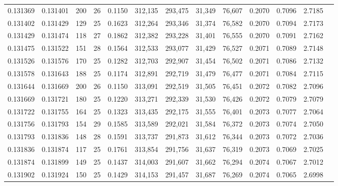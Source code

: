 \begin{tabular}{rrrrrrrrrrrrr}
0.131369 & 0.131401 & 200 &  26 &                                     0.1150 & 312,135 & 293,475 &  31,349 &  76,607 & 0.2070 & 0.7096 & 2.7185 \\
0.131402 & 0.131429 & 129 &  25 &                                     0.1623 & 312,264 & 293,346 &  31,374 &  76,582 & 0.2070 & 0.7094 & 2.7173 \\
0.131429 & 0.131474 & 118 &  27 &                                     0.1862 & 312,382 & 293,228 &  31,401 &  76,555 & 0.2070 & 0.7091 & 2.7162 \\
0.131475 & 0.131522 & 151 &  28 &                                     0.1564 & 312,533 & 293,077 &  31,429 &  76,527 & 0.2071 & 0.7089 & 2.7148 \\
0.131526 & 0.131576 & 170 &  25 &                                     0.1282 & 312,703 & 292,907 &  31,454 &  76,502 & 0.2071 & 0.7086 & 2.7132 \\
0.131578 & 0.131643 & 188 &  25 &                                     0.1174 & 312,891 & 292,719 &  31,479 &  76,477 & 0.2071 & 0.7084 & 2.7115 \\
0.131644 & 0.131669 & 200 &  26 &                                     0.1150 & 313,091 & 292,519 &  31,505 &  76,451 & 0.2072 & 0.7082 & 2.7096 \\
0.131669 & 0.131721 & 180 &  25 &                                     0.1220 & 313,271 & 292,339 &  31,530 &  76,426 & 0.2072 & 0.7079 & 2.7079 \\
0.131722 & 0.131755 & 164 &  25 &                                     0.1323 & 313,435 & 292,175 &  31,555 &  76,401 & 0.2073 & 0.7077 & 2.7064 \\
0.131756 & 0.131793 & 154 &  29 &                                     0.1585 & 313,589 & 292,021 &  31,584 &  76,372 & 0.2073 & 0.7074 & 2.7050 \\
0.131793 & 0.131836 & 148 &  28 &                                     0.1591 & 313,737 & 291,873 &  31,612 &  76,344 & 0.2073 & 0.7072 & 2.7036 \\
0.131836 & 0.131874 & 117 &  25 &                                     0.1761 & 313,854 & 291,756 &  31,637 &  76,319 & 0.2073 & 0.7069 & 2.7025 \\
0.131874 & 0.131899 & 149 &  25 &                                     0.1437 & 314,003 & 291,607 &  31,662 &  76,294 & 0.2074 & 0.7067 & 2.7012 \\
0.131902 & 0.131924 & 150 &  25 &                                     0.1429 & 314,153 & 291,457 &  31,687 &  76,269 & 0.2074 & 0.7065 & 2.6998 \\

\end{tabular}
